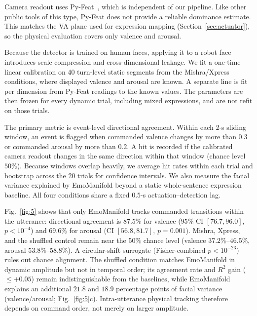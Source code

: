 \documentclass[letterpaper, 10 pt, conference]{ieeeconf/ieeeconf}
\begin{document}
Camera readout uses Py-Feat~\cite{cheong2023pyfeat}, which is independent of our pipeline. Like other public tools of this type, Py-Feat does not provide a reliable dominance estimate. This matches the VA plane used for expression mapping (Section~\ref{sec:actuator}), so the physical evaluation covers only valence and arousal.

Because the detector is trained on human faces, applying it to a robot face introduces scale compression and cross-dimensional leakage. We fit a one-time linear calibration on 40 turn-level static segments from the Mishra/Xpress conditions, where displayed valence and arousal are known. A separate line is fit per dimension from Py-Feat readings to the known values. The parameters are then frozen for every dynamic trial, including mixed expressions, and are not refit on those trials.

The primary metric is event-level directional agreement. Within each 2-s sliding window, an event is flagged when commanded valence changes by more than $0.3$ or commanded arousal by more than $0.2$. A hit is recorded if the calibrated camera readout changes in the same direction within that window (chance level $50\%$). Because windows overlap heavily, we average hit rates within each trial and bootstrap across the 20 trials for confidence intervals. We also measure the facial variance explained by EmoManifold beyond a static whole-sentence expression baseline. All four conditions share a fixed $0.5$-s actuation--detection lag.

Fig.~\ref{fig:5} shows that only EmoManifold tracks commanded transitions within the utterance: directional agreement is $87.5\%$ for valence ($95\%$ CI $[76.7,96.0]$, $p<10^{-4}$) and $69.6\%$ for arousal (CI $[56.8,81.7]$, $p{=}0.001$). Mishra, Xpress, and the shuffled control remain near the $50\%$ chance level (valence $37.2\%$--$46.5\%$, arousal $53.8\%$--$58.8\%$). A circular-shift surrogate (Fisher-combined $p<10^{-23}$) rules out chance alignment. The shuffled condition matches EmoManifold in dynamic amplitude but not in temporal order; its agreement rate and $R^2$ gain ($\le+0.05$) remain indistinguishable from the baselines, while EmoManifold explains an additional $21.8$ and $18.9$ percentage points of facial variance (valence/arousal; Fig.~\ref{fig:5}c). Intra-utterance physical tracking therefore depends on command order, not merely on larger amplitude.
\end{document}
